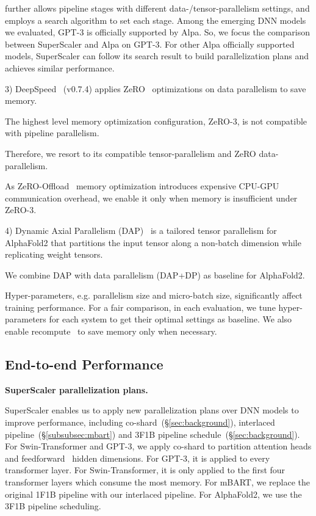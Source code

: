 further allows pipeline stages with different data-/tensor-parallelism settings, and employs a search algorithm to set each stage. Among the emerging DNN models we evaluated, GPT-3 is officially supported by Alpa. So, we focus the comparison between {SuperScaler} and Alpa on GPT-3. For other Alpa officially supported models, {SuperScaler} can follow its search result to build parallelization plans and achieves similar performance. 

3) DeepSpeed~\cite{deepspeed} (v0.7.4) applies ZeRO~\cite{zero, zero-offload} optimizations on data parallelism to save memory. 

The highest level memory optimization configuration, ZeRO-3, is not compatible with pipeline parallelism.

Therefore, we resort to its compatible tensor-parallelism and ZeRO data-parallelism.

As ZeRO-Offload~\cite{zero-offload} memory optimization introduces expensive CPU-GPU communication overhead, we enable it only when memory is insufficient under ZeRO-3.

4) Dynamic Axial Parallelism (DAP)~\cite{fastfold} is a tailored tensor parallelism for AlphaFold2 that partitions the input tensor along a non-batch dimension while replicating weight tensors. 

We combine DAP with data parallelism (DAP+DP) as baseline for AlphaFold2.

Hyper-parameters, e.g. parallelism size and micro-batch size, significantly affect training performance. For a fair comparison, in each evaluation, we tune hyper-parameters for each system to get their optimal settings as baseline. We also enable recompute~\cite{recompute} to save memory only when necessary.

\subsection{End-to-end Performance}
\label{sec:eval-e2e}

{\bf  {SuperScaler} parallelization plans. } 

{SuperScaler} enables us to apply new parallelization plans over DNN models to improve performance, including {co-shard}~(\S \ref{sec:background}), interlaced pipeline~(\S \ref{subsubsec:mbart}) and 3F1B pipeline schedule~(\S \ref{sec:background}).
For Swin-Transformer and GPT-3, we apply {co-shard} to partition attention heads and feedforward~\cite{attention} hidden dimensions. For GPT-3, it is applied to every transformer layer. For Swin-Transformer, it is only applied to the first four transformer layers which consume the most memory. For mBART, we replace the original 1F1B pipeline with our interlaced pipeline. For AlphaFold2, we use the 3F1B pipeline scheduling.

